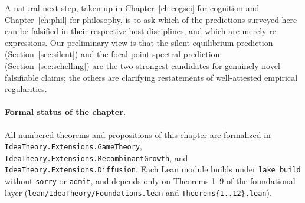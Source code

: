 A natural next step, taken up in Chapter~\ref{ch:cogsci} for cognition
and Chapter~\ref{ch:phil} for philosophy, is to ask which of the
predictions surveyed here can be falsified in their respective host
disciplines, and which are merely re-expressions. Our preliminary
view is that the silent-equilibrium prediction
(Section~\ref{sec:silent}) and the focal-point spectral prediction
(Section~\ref{sec:schelling}) are the two strongest candidates for
genuinely novel falsifiable claims; the others are clarifying
restatements of well-attested empirical regularities.

\paragraph{Formal status of the chapter.} All numbered theorems and
propositions of this chapter are formalized in
\texttt{IdeaTheory.Extensions.GameTheory},
\texttt{IdeaTheory.Extensions.RecombinantGrowth}, and
\texttt{IdeaTheory.Extensions.Diffusion}. Each Lean module builds
under \texttt{lake build} without \texttt{sorry} or \texttt{admit},
and depends only on Theorems 1--9 of the foundational layer
(\texttt{lean/IdeaTheory/Foundations.lean} and
\texttt{Theorems\{1..12\}.lean}).
